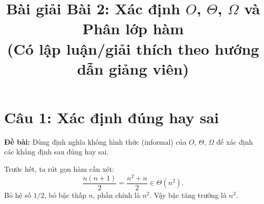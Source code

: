 \documentclass[12pt,a4paper]{article}
\title{\textbf{Bài giải Bài 2: Xác định $O$, $\Theta$, $\Omega$ và Phân lớp hàm}\\[6pt]
\large (Có lập luận/giải thích theo hướng dẫn giảng viên)}
\author{}
\date{}
\begin{document}
\maketitle
\thispagestyle{fancy}

\section{Câu 1: Xác định đúng hay sai}

\textbf{Đề bài:} Dùng định nghĩa không hình thức (informal) của $O$, $\Theta$, $\Omega$ để xác định các khẳng định sau đúng hay sai.

\bigskip

Trước hết, ta rút gọn hàm cần xét:
\[
  \frac{n(n+1)}{2} = \frac{n^2 + n}{2} \in \Theta(n^2).
\]
Bỏ hệ số $1/2$, bỏ bậc thấp $n$, phần chính là $n^2$. Vậy bậc tăng trưởng là $n^2$.

\bigskip
\end{document}
